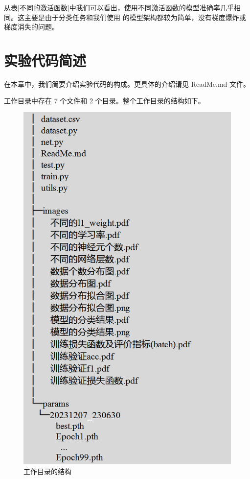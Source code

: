 \documentclass[supercite]{Experimental_Report}
\theoremstyle{definition}
\begin{document}
从表\ref{不同的激活函数}中我们可以看出，使用不同激活函数的模型准确率几乎相同。这主要是由于分类任务和我们使用
的模型架构都较为简单，没有梯度爆炸或梯度消失的问题。

\section{实验代码简述}
在本章中，我们简要介绍实验代码的构成。更具体的介绍请见 ReadMe.md 文件。

工作目录中存在 7 个文件和 2 个目录。整个工作目录的结构如下。
\begin{figure}[H]
	\begin{center}
		\includegraphics[scale=0.5]{../images/tree.png}
		\caption{工作目录的结构}
	\end{center}
\end{figure}
\end{document}
